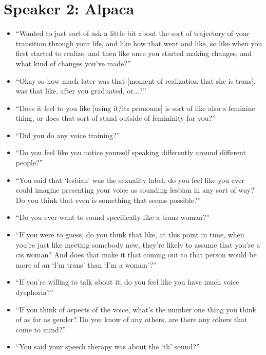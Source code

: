 \documentclass[12pt,twoside]{reedthesis}
\begin{document}
\section{Speaker 2: Alpaca}
\begin{itemize}
 \item ``Wanted to just sort of ask a little bit about the sort of trajectory of your transition through your life, and like how that went and like, so like when you first started to realize, and then like once you started making changes, and what kind of changes you've made?''
 \item ``Okay so how much later was that [moment of realization that she is trans], was that like, after you graduated, or...?''
 \item ``Does it feel to you like [using it/its pronouns] is sort of like also a feminine thing, or does that sort of stand outside of femininity for you?''
 \item ``Did you do any voice training?''
 \item ``Do you feel like you notice yourself speaking differently around different people?''
 \item ``You said that `lesbian' was the sexuality label, do you feel like you ever could imagine presenting your voice as sounding lesbian in any sort of way? Do you think that even is something that seems possible?''
 \item ``Do you ever want to sound specifically like a trans woman?''
 \item ``If you were to guess, do you think that like, at this point in time, when you're just like meeting somebody new, they're likely to assume that you're a cis woman? And does that make it that coming out to that person would be more of an `I'm trans' than
 `I'm a woman'?''
 \item ``If you're willing to talk about it, do you feel like you have much voice dysphoria?''
 \item ``If you think of aspects of the voice, what's the number one thing you think of as far as gender? Do you know of any others, are there any others that come to mind?''
 \item ``You said your speech therapy was about the `th' sound?''
\end{itemize}
\end{document}
